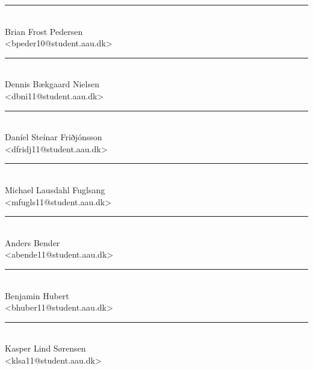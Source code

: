
\begin{minipage}[b]{0.45\textwidth}
 \centering
 \vspace{12pt}
 \rule{\textwidth}{0.5pt}\\
  Brian Frost Pedersen\\
 {\footnotesize <bpeder10@student.aau.dk>}\\
 \vspace{12pt}
 \centering
 \vspace{12pt}
 \rule{\textwidth}{0.5pt}\\
  Dennis Bækgaard Nielsen\\
 {\footnotesize <dbni11@student.aau.dk>}\\
 \vspace{12pt}
 \centering
 \vspace{12pt}
 \rule{\textwidth}{0.5pt}\\
  Daníel Steínar Friðjónsson\\
 {\footnotesize <dfridj11@student.aau.dk>}\\
 \vspace{12pt}
 \centering
 \vspace{12pt}
 \rule{\textwidth}{0.5pt}\\
  Michael Lausdahl Fuglsang\\
 {\footnotesize <mfugls11@student.aau.dk>}\\
 \vspace{12pt}
\end{minipage}
\hfill
\begin{minipage}[b]{0.45\textwidth}
 \centering
 \vspace{12pt}
 \rule{\textwidth}{0.5pt}\\
  Anders Bender\\
 {\footnotesize <abende11@student.aau.dk>}\\
 \vspace{12pt}
 \centering
 \vspace{12pt}
 \rule{\textwidth}{0.5pt}\\
  Benjamin Hubert\\
 {\footnotesize <bhuber11@student.aau.dk>}\\
 \vspace{12pt}
 \centering
 \vspace{12pt}
 \rule{\textwidth}{0.5pt}\\
  Kasper Lind Sørensen\\
 {\footnotesize <klsa11@student.aau.dk>}\\
  \vspace{12pt}
\end{minipage}%

